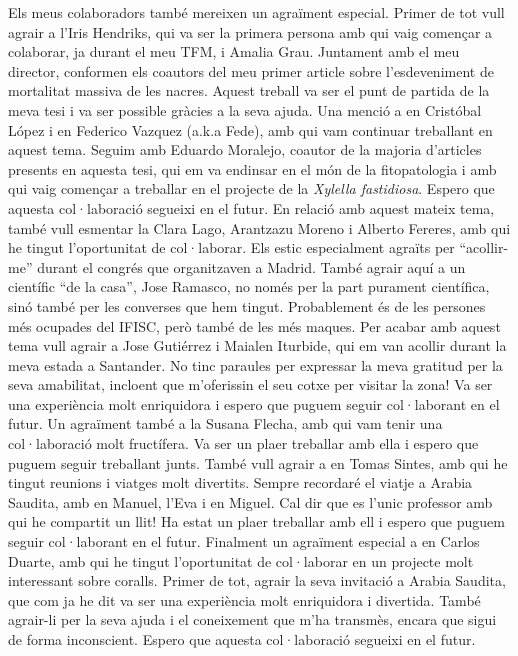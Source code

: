 Els meus colaboradors també mereixen un agraïment especial. Primer de tot vull
agrair a l'Iris Hendriks, qui va ser la primera persona amb qui vaig començar a
colaborar, ja durant el meu TFM, i Amalia Grau. Juntament amb el meu director,
conformen els coautors del meu primer article sobre l'esdeveniment de
mortalitat massiva de les nacres. Aquest treball va ser el punt de partida de
la meva tesi i va ser possible gràcies a la seva ajuda. Una menció a en
Cristóbal López i en Federico Vazquez (a.k.a Fede), amb qui vam continuar
treballant en aquest tema. Seguim amb Eduardo Moralejo, coautor de la majoria
d'articles presents en aquesta tesi, qui em va endinsar en el món de la
fitopatologia i amb qui vaig començar a treballar en el projecte de la
\textit{Xylella fastidiosa}. Espero que aquesta col·laboració segueixi en el
futur. En relació amb aquest mateix tema, també vull esmentar la Clara Lago,
Arantzazu Moreno i Alberto Fereres, amb qui he tingut l'oportunitat de
col·laborar. Els estic especialment agraïts per ``acollir-me'' durant el
congrés que organitzaven a Madrid. També agrair aquí a un científic ``de la
casa'', Jose Ramasco, no només per la part purament científica, sinó també per
les converses que hem tingut. Probablement és de les persones més ocupades del
IFISC, però també de les més maques. Per acabar amb aquest tema vull agrair a
Jose Gutiérrez i Maialen Iturbide, qui em van acollir durant la meva estada a
Santander. No tinc paraules per expressar la meva gratitud per la seva
amabilitat, incloent que m'oferissin el seu cotxe per visitar la zona! Va ser
una experiència molt enriquidora i espero que puguem seguir col·laborant en el
futur. Un agraïment també a la Susana Flecha, amb qui vam tenir una
col·laboració molt fructífera. Va ser un plaer treballar amb ella i espero que
puguem seguir treballant junts. També vull agrair a en Tomas Sintes, amb qui he
tingut reunions i viatges molt divertits. Sempre recordaré el viatje a Arabia
Saudita, amb en Manuel, l'Eva i en Miguel. Cal dir que es l'unic professor amb
qui he compartit un llit! Ha estat un plaer treballar amb ell i espero que
puguem seguir col·laborant en el futur. Finalment un agraïment especial a en
Carlos Duarte, amb qui he tingut l'oportunitat de col·laborar en un projecte
molt interessant sobre coralls. Primer de tot, agrair la seva invitació a
Arabia Saudita, que com ja he dit va ser una experiència molt
enriquidora i divertida. També agrair-li per la seva ajuda i el coneixement que
m'ha transmès, encara que sigui de forma inconscient. Espero que aquesta
col·laboració segueixi en el futur.

